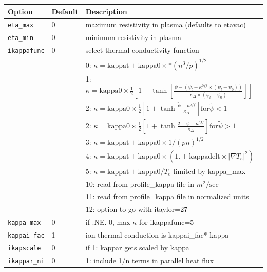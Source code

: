 \begin{tabular}{llp{4.0in}}
  \textbf{Option}&\textbf{Default}&\textbf{Description}\\
  \hline
  \texttt{eta\_max} & 0 & maximum resistivity in plasma (defaults to etavac) \\
  \texttt{eta\_min} & 0 & minimum resistivity in plasma  \\
  \hline
  \texttt{ikappafunc} & 0 &  select thermal conductivity function \\
    & & 0: $\kappa = \mbox{kappat} + \mbox{kappa0} \times * (n^3/p)^{1/2}  $\\
    & & 1: $\kappa = \mbox{kappa0} \times \frac{1}{2}
                    \left[1 + \tanh \left[\frac{\psi -\left( \psi_l + \kappa^{0ff} \times (\psi_l - \psi_0)\right)}
                                               {\kappa_{\Delta} \times (\psi_l - \psi_0)} \right]  \right]$ \\
    & & 2: $\kappa = \mbox{kappa0} \times \frac{1}{2}
                    \left[  1 + \tanh \frac{\tilde{\psi} - \kappa^{off}}
                                           {  \kappa_{\Delta}}  \right] \mbox{for} \tilde{\psi} < 1 $  \\
    & & 2: $\kappa = \mbox{kappa0} \times \frac{1}{2}
                    \left[  1 + \tanh \frac{2 - \tilde{\psi} - \kappa^{off}}
                                           {  \kappa_{\Delta}}  \right] \mbox{for} \tilde{\psi} > 1 $  \\
    & & 3:  $\kappa = \mbox{kappat} + \mbox{kappa0} \times 1/(pn)^{1/2}$ \\
    & & 4:  $\kappa = \mbox{kappat} + \mbox{kappa0} \times ( 1. + \mbox{kappadelt} \times |\nabla T_e|^2 ) $  \\
    & & 5:  $\kappa = \mbox{kappat} + \mbox{kappa0}/T_e$ limited by kappa\_max  \\ 
    & & 10: read from profile\_kappa file in $m^2/\mbox{sec}$  \\ 
    & & 11: read from profile\_kappa file in normalized units  \\
    & & 12: option to go with itaylor=27   \\
 \texttt{kappa\_max}  & 0 & if .NE. 0, max $\kappa$ for ikappafunc=5 \\
 \texttt{kappai\_fac} & 1 & ion thermal conduction is kappai\_fac* kappa \\
 \texttt{ikapscale}   & 0 & if 1: kappar gets scaled by kappa  \\
 \texttt{ikappar\_ni} & 0 & 1: include 1/n terms in parallel heat flux \\

\end{tabular}
